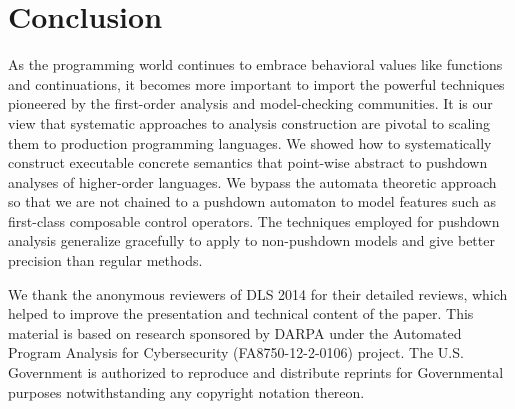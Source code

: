 \documentclass{sigplanconf}
\begin{document}
\section{Conclusion}
As the programming world continues to embrace behavioral values like functions and continuations, it becomes more important to import the powerful techniques pioneered by the first-order analysis and model-checking communities.
%
It is our view that systematic approaches to analysis construction are pivotal to scaling them to production programming languages.
%
We showed how to systematically construct executable concrete semantics that point-wise abstract to pushdown analyses of higher-order languages.
%
We bypass the automata theoretic approach so that we are not chained to a pushdown automaton to model features such as first-class composable control operators.
%
The techniques employed for pushdown analysis generalize gracefully to apply to non-pushdown models and give better precision than regular methods.


\acks We thank the anonymous reviewers of DLS 2014 for their detailed
reviews, which helped to improve the presentation and technical
content of the paper.
%
This material is based on research sponsored by DARPA under the
Automated Program Analysis for Cybersecurity (FA8750-12-2-0106)
project. The U.S. Government is authorized to reproduce and distribute
reprints for Governmental purposes notwithstanding any copyright
notation thereon.

\balance


\end{document}
